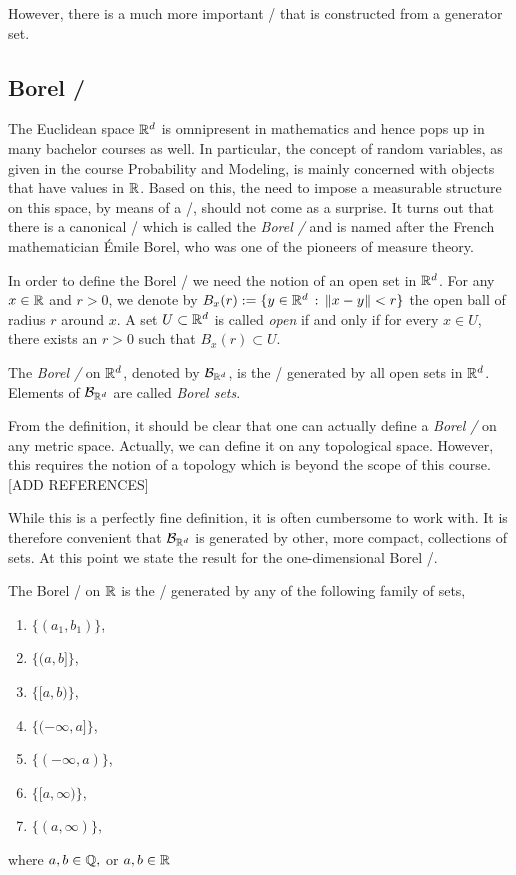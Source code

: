 However, there is a much more important \sigalg/ that is constructed from a generator set.

\subsection{Borel \sigalg/}

The Euclidean space $\mathbb R^d$ is omnipresent in mathematics and hence pops up in many bachelor courses as well. In particular, the concept of random variables, as given in the course Probability and Modeling, is mainly concerned with objects that have values in $\mathbb R$. Based on this, the need to impose a measurable structure on this space, by means of a \sigalg/, should not come as a surprise. It turns out that there is a canonical \sigalg/ which is called the \emph{Borel \sigalg/} and is named after the French mathematician \'{E}mile Borel, who was one of the pioneers of measure theory.

In order to define the Borel \sigalg/ we need the notion of an open set in $\mathbb R^d$. For any $x \in \mathbb R$ and $r >0$, we denote by $B_x(r) := \{y \in \mathbb R^d \, : \, \|x-y\|<r\}$ the open ball of radius $r$ around $x$. A set $U \subset \mathbb R^d$ is called \emph{open} if and only if for every $x \in U$, there exists an $r > 0$ such that $B_x(r) \subset U$.

\begin{definition}
The \emph{Borel \sigalg/} on $\mathbb R^d$, denoted by $\mathcal B_{\mathbb R^d}$, is the \sigalg/ generated by all open sets in $\mathbb R^d$. Elements of $\mathcal B_{\mathbb R^d}$ are called \emph{Borel sets}.
\end{definition}

\begin{remark}
From the definition, it should be clear that one can actually define a \emph{Borel \sigalg/} on any metric space. Actually, we can define it on any topological space. However, this requires the notion of a topology which is beyond the scope of this course. [ADD REFERENCES]
\end{remark}

While this is a perfectly fine definition, it is often cumbersome to work with. It is therefore convenient that $\mathcal B_{\mathbb R^d}$ is generated by other, more compact, collections of sets. At this point we state the result for the one-dimensional Borel \sigalg/. 

\begin{proposition}\label{prop:characterization_borel_sigalg_1d}
The Borel \sigalg/ on $\mathbb R$ is the \sigalg/ generated by any of the following family of sets, 
\begin{enumerate}
\item $\{(a_1, b_1)\}$,
\item $\{(a, b]\}$,
\item $\{[a, b)\}$,
\item $\{(-\infty,a]\}$,
\item $\{(-\infty,a)\}$,
\item $\{[a, \infty)\}$,
\item $\{(a,\infty)\}$,
\end{enumerate}
where $a, b \in \mathbb Q,$ or $a, b \in \mathbb R$
\end{proposition}

